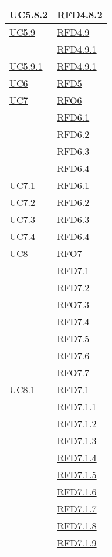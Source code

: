 \begin{longtable}{|>{\centering}m{5cm}|m{5cm}<{\centering}|}
\hyperref[UC5.8.2]{UC5.8.2} & \hyperlink{RFD4.8.2}{RFD4.8.2}\\ \hline
\hyperref[UC5.9]{UC5.9} & \hyperlink{RFD4.9}{RFD4.9}\\
& \hyperlink{RFD4.9.1}{RFD4.9.1}\\ \hline
\hyperref[UC5.9.1]{UC5.9.1} & \hyperlink{RFD4.9.1}{RFD4.9.1}\\ \hline
\hyperref[UC6]{UC6} & \hyperlink{RFD5}{RFD5}\\ \hline
\hyperref[UC7]{UC7} & \hyperlink{RFO6}{RFO6}\\
& \hyperlink{RFD6.1}{RFD6.1}\\
& \hyperlink{RFD6.2}{RFD6.2}\\
& \hyperlink{RFD6.3}{RFD6.3}\\
& \hyperlink{RFD6.4}{RFD6.4}\\ \hline
\hyperref[UC7.1]{UC7.1} & \hyperlink{RFD6.1}{RFD6.1}\\ \hline
\hyperref[UC7.2]{UC7.2} & \hyperlink{RFD6.2}{RFD6.2}\\ \hline
\hyperref[UC7.3]{UC7.3} & \hyperlink{RFD6.3}{RFD6.3}\\ \hline
\hyperref[UC7.4]{UC7.4} & \hyperlink{RFD6.4}{RFD6.4}\\ \hline
\hyperref[UC8]{UC8} & \hyperlink{RFO7}{RFO7}\\
& \hyperlink{RFD7.1}{RFD7.1}\\
& \hyperlink{RFD7.2}{RFD7.2}\\
& \hyperlink{RFO7.3}{RFO7.3}\\
& \hyperlink{RFD7.4}{RFD7.4}\\
& \hyperlink{RFD7.5}{RFD7.5}\\
& \hyperlink{RFD7.6}{RFD7.6}\\
& \hyperlink{RFO7.7}{RFO7.7}\\ \hline
\hyperref[UC8.1]{UC8.1} & \hyperlink{RFD7.1}{RFD7.1}\\
& \hyperlink{RFD7.1.1}{RFD7.1.1}\\
& \hyperlink{RFD7.1.2}{RFD7.1.2}\\
& \hyperlink{RFD7.1.3}{RFD7.1.3}\\
& \hyperlink{RFD7.1.4}{RFD7.1.4}\\
& \hyperlink{RFD7.1.5}{RFD7.1.5}\\
& \hyperlink{RFD7.1.6}{RFD7.1.6}\\
& \hyperlink{RFD7.1.7}{RFD7.1.7}\\
& \hyperlink{RFD7.1.8}{RFD7.1.8}\\
& \hyperlink{RFD7.1.9}{RFD7.1.9}\\

\end{longtable}
